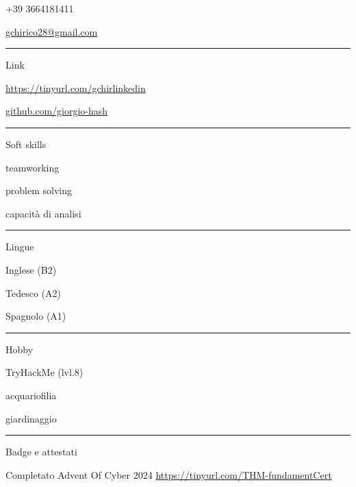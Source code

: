 \documentclass[a4paper]{letter}
\begin{document}
\begin{minipage}[t]{0.30\textwidth}
\faPhone \quad +39 3664181411

\faEnvelope \quad \href{mailto://gchirico28@gmail.com}{gchirico28@gmail.com}

\rule{\linewidth}{0.4pt}

{\large Link}

\faLinkedin \quad \href{https://tinyurl.com/gchirlinkedin}{https://tinyurl.com/gchirlinkedin}

\faGithub \quad \href{https://github.com/giorgio-hash}{github.com/giorgio-hash}

\rule{\linewidth}{0.4pt}

{\large Soft skills}

\faCircleNotch \quad teamworking

\faCircleNotch \quad problem solving

\faCircleNotch \quad capacità di analisi

\rule{\linewidth}{0.4pt}

{\large Lingue}

\faLanguage \quad Inglese  (B2)

\faLanguage \quad Tedesco  (A2)

\faLanguage \quad Spagnolo (A1)

\rule{\linewidth}{0.4pt}

{\large Hobby}

\faCloud \quad TryHackMe (lvl.8)

\faFish \quad acquariofilia

\faLeaf \quad giardinaggio

\rule{\linewidth}{0.4pt}

{\large Badge e attestati}

\faAward \quad Completato Advent Of Cyber 2024 
\href{https://tinyurl.com/THM-fundamentCert}{https://tinyurl.com/THM-fundamentCert}

\end{minipage}
\hfill
\end{document}
